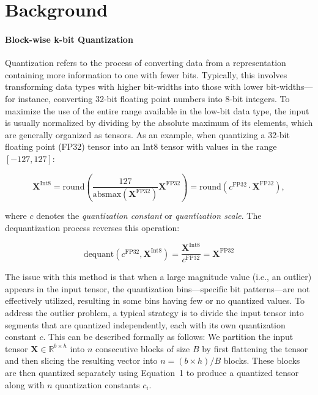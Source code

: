\section{Background}
\paragraph{Block-wise k-bit Quantization} Quantization refers to the process of converting data from a representation containing more information to one with fewer bits. Typically, this involves transforming data types with higher bit-widths into those with lower bit-widths—for instance, converting 32-bit floating point numbers into 8-bit integers. To maximize the use of the entire range available in the low-bit data type, the input is usually normalized by dividing by the absolute maximum of its elements, which are generally organized as tensors. As an example, when quantizing a 32-bit floating point (FP32) tensor into an Int8 tensor with values in the range $[-127, 127]$:

\begin{equation}
    \mathbf{X}^{ \text{Int8}} = \text{round}\left( \frac{127}{{\text{absmax}}(\mathbf{X}^{{\text{FP32}}})}\mathbf{X}^{{\text{FP32}}} \right) = \text{round}(c^{\text{FP32}}\cdot \mathbf{X}^{{\text{FP32}}}),
\end{equation}

where $c$ denotes the {\em quantization constant} or {\em quantization scale}. The dequantization process reverses this operation:

\begin{equation}
    \text{dequant}(c^{\text{FP32}}, \mathbf{X}^{\text{Int8}}) = \frac{\mathbf{X}^{\text{Int8}}}{c^{\text{FP32}}} = \mathbf{X}^{\text{FP32}}
\end{equation}

The issue with this method is that when a large magnitude value (i.e., an outlier) appears in the input tensor, the quantization bins—specific bit patterns—are not effectively utilized, resulting in some bins having few or no quantized values. To address the outlier problem, a typical strategy is to divide the input tensor into segments that are quantized independently, each with its own quantization constant $c$. This can be described formally as follows: We partition the input tensor $\mathbf{X} \in \mathbb{R}^{b\times h}$ into $n$ consecutive blocks of size $B$ by first flattening the tensor and then slicing the resulting vector into ${n = ({b\times h})/{B}}$ blocks. These blocks are then quantized separately using Equation~1 to produce a quantized tensor along with $n$ quantization constants $c_i$.

